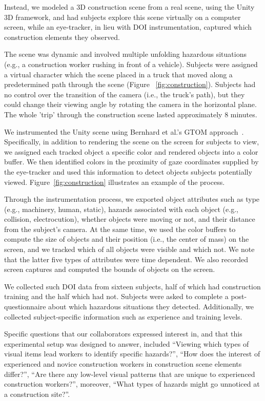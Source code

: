 Instead, we modeled a 3D construction scene from a real scene, using the Unity 3D framework, and had subjects explore this scene virtually on a computer screen, while an eye-tracker, in lieu with DOI instrumentation, captured which construction elements they observed. 

The scene was dynamic and involved multiple unfolding hazardous situations (e.g., a construction worker rushing in front of a vehicle). Subjects were assigned a virtual character which the scene placed in a truck that moved along a predetermined path through the scene (Figure ~\ref{fig:construction}). Subjects had no control over the transition of the camera (i.e., the truck's path), but they could change their viewing angle by rotating the camera in the horizontal plane. The whole 'trip' through the construction scene lasted approximately $8$ minutes. 

We instrumented the Unity scene using Bernhard et al.'s GTOM approach~\cite{Bern14}. Specifically, in addition to rendering the scene on the screen for subjects to view, we assigned each tracked object a specific color and rendered objects into a color buffer. We then identified colors in the proximity of gaze coordinates supplied by the eye-tracker and used this information to detect objects subjects potentially viewed. Figure~\ref{fig:construction} illustrates an example of the process.

Through the instrumentation process, we exported object attributes such as type (e.g., machinery, human, static), hazards associated with each object (e.g., collision, electrocution), whether objects were moving or not,  and their distance from the subject's camera. At the same time, we used the color buffers to compute the size of objects and their position (i.e., the center of mass) on the screen, and we tracked which of all objects were visible and which not. We note that the latter five types of attributes were time dependent. We also recorded screen captures and computed the bounds of objects on the screen. 

We collected such DOI data from sixteen subjects, half of which had construction training and the half which had not. Subjects were asked to complete a post-questionnaire about which hazardous situations they detected. Additionally, we collected subject-specific information such as experience and training levels. 

Specific questions that our collaborators expressed interest in, and that this experimental setup was designed to answer, included ``Viewing which types of visual items lead workers to identify specific hazards?'', ``How does the interest of experienced and novice construction workers in construction scene elements differ?'', ``Are there any low-level visual patterns that are unique to experienced construction workers?'', moreover, ``What types of hazards might go unnoticed at a construction site?''.

